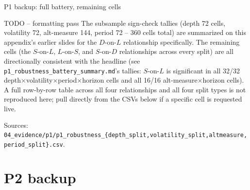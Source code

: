 \documentclass[aspectratio=169]{beamer}
\begin{document}
\begin{frame}{P1 backup: full battery, remaining cells}
  \begin{center}
  \begin{block}{TODO -- formatting pass}
    \small The subsample sign-check tallies (depth 72 cells, volatility 72, alt-measure 144, period 72 -- 360 cells total) are summarized on this appendix's earlier slides for the $D$-on-$L$ relationship specifically. The remaining cells (the $S$-on-$L$, $L$-on-$S$, and $S$-on-$D$ relationships across every split) are all directionally consistent with the headline (see \texttt{p1\_robustness\_battery\_summary.md}'s tallies: $S$-on-$L$ is significant in all 32/32 depth$\times$volatility$\times$period$\times$horizon cells and all 16/16 alt-measure$\times$horizon cells). A full row-by-row table across all four relationships and all four split types is not reproduced here; pull directly from the CSVs below if a specific cell is requested live.
  \end{block}
  \end{center}
  {\scriptsize Sources: \texttt{04\_evidence/p1/p1\_robustness\_\{depth\_split,volatility\_split,altmeasure,period\_split\}.csv}.}
\end{frame}

\section{P2 backup}
\end{document}
